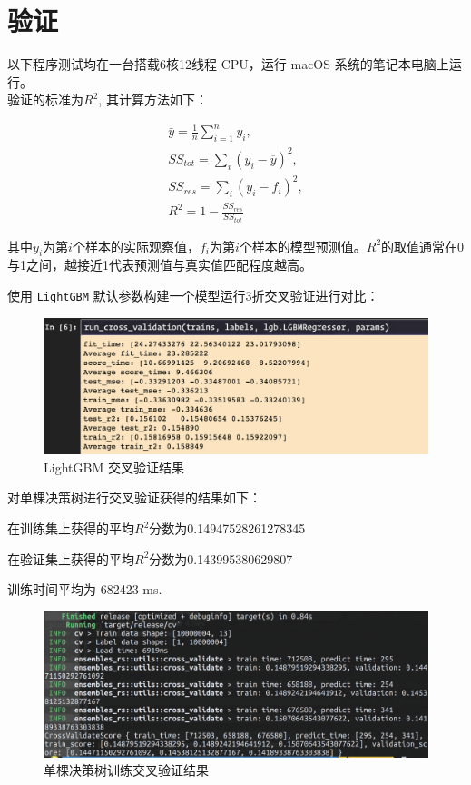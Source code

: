 \documentclass[12pt]{article}
\begin{document}
\section{验证}
以下程序测试均在一台搭载6核12线程 CPU，运行 macOS 系统的笔记本电脑上运行。
\\

验证的标准为$R^2$, 其计算方法如下：

\begin{equation}
    \begin{aligned}
    \bar{y}= \frac{1}{n}\sum_{i=1}^n y_i,\\
    SS_{tot} = \sum_i(y_i-\overline{y})^2,\\
    SS_{res} = \sum_i(y_i-f_i)^2,\\
    R^2 = 1 - \frac{SS_{res}}{SS_{tot}}
    \end{aligned}
\end{equation}

其中$y_i$为第$i$个样本的实际观察值，$f_i$为第$i$个样本的模型预测值。$R^2$的取值通常在0与1之间，越接近1代表预测值与真实值匹配程度越高。


使用 \lstinline{LightGBM} 默认参数构建一个模型运行3折交叉验证进行对比：

\begin{figure}[H]
    \centering
    \includegraphics[scale=0.6]{lgb-baseline.png}
    \caption{LightGBM 交叉验证结果}
    \label{}
\end{figure}

对单棵决策树进行交叉验证获得的结果如下：

在训练集上获得的平均$R^2$分数为0.14947528261278345

在验证集上获得的平均$R^2$分数为0.143995380629807

训练时间平均为 682423 ms.

\begin{figure}[H]
    \centering
    \includegraphics[scale=0.6]{single-tree-cv.png}
    \caption{单棵决策树训练交叉验证结果}
    \label{}
\end{figure}
\end{document}
